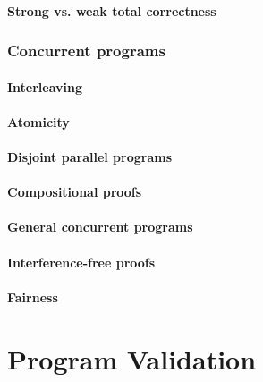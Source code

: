 \documentclass[12pt, a4paper]{book}
\begin{document}
  \subsubsection{Strong vs. weak total correctness}
  \label{subs:Strong vs. weak total correctness}
  \subsection{Concurrent programs}
  \label{sub:Concurrent programs}
  \subsubsection{Interleaving}
  \label{subs:Interleaving}
  \subsubsection{Atomicity}
  \label{subs:Atomicity}
  \subsubsection{Disjoint parallel programs}
  \label{subs:Disjoint parallel programs}
  \subsubsection{Compositional proofs}
  \label{subs:Compositional proofs}
  \subsubsection{General concurrent programs}
  \label{subs:General concurrent programs}
  \subsubsection{Interference-free proofs}
  \label{subs:Interference-free proofs}
  \subsubsection{Fairness}
  \label{subs:Fairness}



  \chapter{Program Validation}
  \label{chap:Program Validation}
\end{document}
